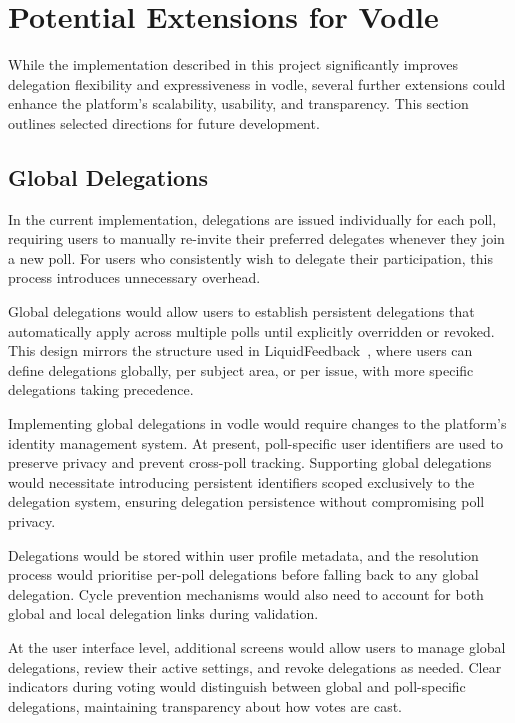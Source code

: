\section{Potential Extensions for Vodle}

While the implementation described in this project significantly improves delegation flexibility and expressiveness in vodle, several further extensions could enhance the platform's scalability, usability, and transparency. This section outlines selected directions for future development.

\subsection{Global Delegations}

In the current implementation, delegations are issued individually for each poll, requiring users to manually re-invite their preferred delegates whenever they join a new poll. For users who consistently wish to delegate their participation, this process introduces unnecessary overhead.

Global delegations would allow users to establish persistent delegations that automatically apply across multiple polls until explicitly overridden or revoked. This design mirrors the structure used in LiquidFeedback~\citep{behrens_liquidfeedback_2014}, where users can define delegations globally, per subject area, or per issue, with more specific delegations taking precedence.

Implementing global delegations in vodle would require changes to the platform's identity management system. At present, poll-specific user identifiers are used to preserve privacy and prevent cross-poll tracking. Supporting global delegations would necessitate introducing persistent identifiers scoped exclusively to the delegation system, ensuring delegation persistence without compromising poll privacy.

Delegations would be stored within user profile metadata, and the resolution process would prioritise per-poll delegations before falling back to any global delegation. Cycle prevention mechanisms would also need to account for both global and local delegation links during validation.

At the user interface level, additional screens would allow users to manage global delegations, review their active settings, and revoke delegations as needed. Clear indicators during voting would distinguish between global and poll-specific delegations, maintaining transparency about how votes are cast.

